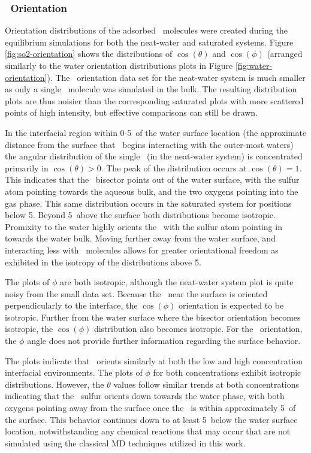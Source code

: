 \documentclass{article}
\begin{document}
\subsubsection{\suldiox~Orientation}

Orientation distributions of the adsorbed \suldiox~molecules were created during the equilibrium simulations for both the neat-water and saturated systems. Figure \ref{fig:so2-orientation} shows the distributions of $\cos(\theta)$ and $\cos(\phi)$ (arranged similarly to the water orientation distributions plots in Figure \ref{fig:water-orientation}). The \suldiox~orientation data set for the neat-water system is much smaller as only a single \suldiox~molecule was simulated in the bulk. The resulting distribution plots are thus noisier than the corresponding saturated plots with more scattered points of high intensity, but effective comparisons can still be drawn.

In the interfacial region within 0-5\angs~of the water surface location (the approximate distance from the surface that \suldiox~begins interacting with the outer-most waters) the angular distribution of the single \suldiox~(in the neat-water system) is concentrated primarily in $\cos(\theta)>0$. The peak of the distribution occurs at $\cos(\theta)=1$. This indicates that the \suldiox~bisector points out of the water surface, with the sulfur atom pointing towards the aqueous bulk, and the two oxygens pointing into the gas phase. This same distribution occurs in the saturated system for positions below 5\angs. Beyond 5\angs~above the surface both distributions become isotropic. Promixity to the water highly orients the \suldiox~with the sulfur atom pointing in towards the water bulk. Moving further away from the water surface, and interacting less with \wat~molecules allows for greater orientational freedom as exhibited in the isotropy of the distributions above 5\angs. 

The plots of $\phi$ are both isotropic, although the neat-water system plot is quite noisy from the small data set. Because the \suldiox~near the surface is oriented perpendicularly to the interface, the $\cos(\phi)$ orientation is expected to be isotropic. Further from the water surface where the bisector orientation becomes isotropic, the $\cos(\phi)$ distribution also becomes isotropic. For the \suldiox~orientation, the $\phi$ angle does not provide further information regarding the surface behavior.

The plots indicate that \suldiox~orients similarly at both the low and high concentration interfacial environments. The plots of $\phi$ for both concentrations exhibit isotropic distributions. However, the $\theta$ values follow similar trends at both concentrations indicating that the \suldiox~sulfur orients down towards the water phase, with both oxygens pointing away from the surface once the \suldiox~is within approximately 5\angs~of the surface. This behavior continues down to at least 5\angs~below the water surface location, notwithstanding any chemical reactions that may occur that are not simulated using the classical MD techniques utilized in this work.
\end{document}
